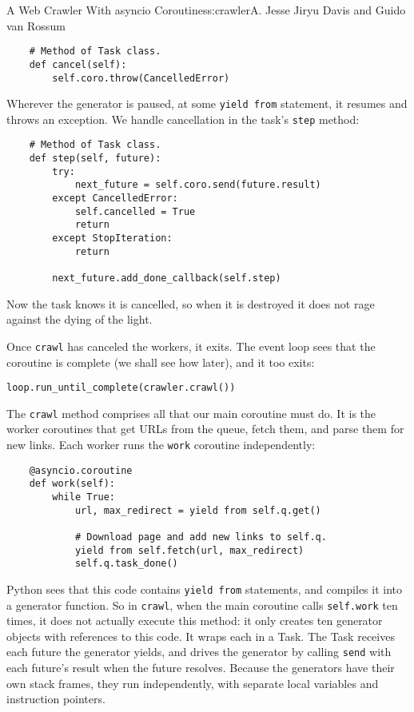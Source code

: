 \begin{aosachapter}{A Web Crawler With asyncio Coroutines}{s:crawler}{A. Jesse Jiryu Davis and Guido van Rossum}
\begin{verbatim}
    # Method of Task class.
    def cancel(self):
        self.coro.throw(CancelledError)
\end{verbatim}

Wherever the generator is paused, at some \texttt{yield from} statement,
it resumes and throws an exception. We handle cancellation in the task's
\texttt{step} method:

\begin{verbatim}
    # Method of Task class.
    def step(self, future):
        try:
            next_future = self.coro.send(future.result)
        except CancelledError:
            self.cancelled = True
            return
        except StopIteration:
            return

        next_future.add_done_callback(self.step)
\end{verbatim}

Now the task knows it is cancelled, so when it is destroyed it does not
rage against the dying of the light.

Once \texttt{crawl} has canceled the workers, it exits. The event loop
sees that the coroutine is complete (we shall see how later), and it too
exits:

\begin{verbatim}
loop.run_until_complete(crawler.crawl())
\end{verbatim}

The \texttt{crawl} method comprises all that our main coroutine must do.
It is the worker coroutines that get URLs from the queue, fetch them,
and parse them for new links. Each worker runs the \texttt{work}
coroutine independently:

\begin{verbatim}
    @asyncio.coroutine
    def work(self):
        while True:
            url, max_redirect = yield from self.q.get()

            # Download page and add new links to self.q.
            yield from self.fetch(url, max_redirect)
            self.q.task_done()
\end{verbatim}

Python sees that this code contains \texttt{yield from} statements, and
compiles it into a generator function. So in \texttt{crawl}, when the
main coroutine calls \texttt{self.work} ten times, it does not actually
execute this method: it only creates ten generator objects with
references to this code. It wraps each in a Task. The Task receives each
future the generator yields, and drives the generator by calling
\texttt{send} with each future's result when the future resolves.
Because the generators have their own stack frames, they run
independently, with separate local variables and instruction pointers.


\end{aosachapter}
